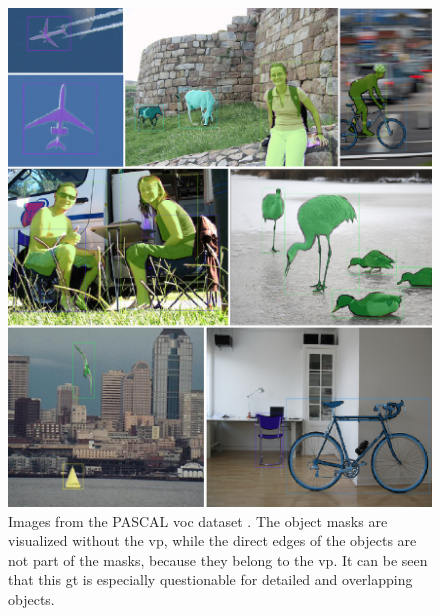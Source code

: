 


\begin{figure}
	\includegraphics[width=\linewidth]{figures/appendix/pascal_voc/pascal_voc_collage.png}
	\caption[PASCAL VOC images with instance masks]{		
		Images from the PASCAL \gls{voc} dataset \cite{Eve20-PascalVOC}. 
		The object masks are visualized without the \gls{vp}, while the direct edges of the objects are not part of the masks, because they belong to the \gls{vp}.
	 	It can be seen that this \gls{gt} is especially questionable for detailed and overlapping objects.
	}
	\label{fig:appendix_pascal_voc}
\end{figure}
